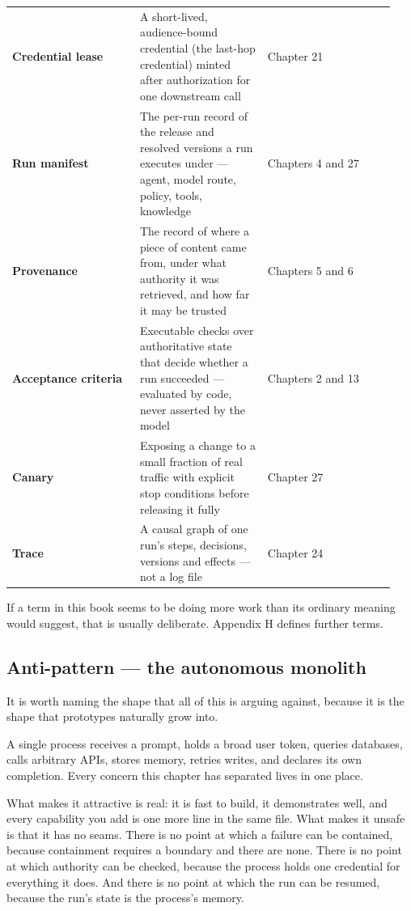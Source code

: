 \begin{longtable}{@{}Y{0.3133\linewidth}Y{0.3133\linewidth}Y{0.3133\linewidth}@{}}
\textbf{Credential lease} & A short-lived, audience-bound credential (the last-hop credential) minted after authorization for one downstream call & Chapter 21 \\
\textbf{Run manifest} & The per-run record of the release and resolved versions a run executes under — agent, model route, policy, tools, knowledge & Chapters 4 and 27 \\
\textbf{Provenance} & The record of where a piece of content came from, under what authority it was retrieved, and how far it may be trusted & Chapters 5 and 6 \\
\textbf{Acceptance criteria} & Executable checks over authoritative state that decide whether a run succeeded — evaluated by code, never asserted by the model & Chapters 2 and 13 \\
\textbf{Canary} & Exposing a change to a small fraction of real traffic with explicit stop conditions before releasing it fully & Chapter 27 \\
\textbf{Trace} & A causal graph of one run's steps, decisions, versions and effects — not a log file & Chapter 24 \\
\end{longtable}
\BookTableEnd

If a term in this book seems to be doing more work than its ordinary meaning would suggest, that is usually deliberate. Appendix H defines further terms.\par

\subsection{Anti-pattern — the autonomous monolith}

It is worth naming the shape that all of this is arguing against, because it is the shape that prototypes naturally grow into.\par

A single process receives a prompt, holds a broad user token, queries databases, calls arbitrary APIs, stores memory, retries writes, and declares its own completion. Every concern this chapter has separated lives in one place.\par

What makes it attractive is real: it is fast to build, it demonstrates well, and every capability you add is one more line in the same file. What makes it unsafe is that it has no seams. There is no point at which a failure can be contained, because containment requires a boundary and there are none. There is no point at which authority can be checked, because the process holds one credential for everything it does. And there is no point at which the run can be resumed, because the run's state is the process's memory.\par

